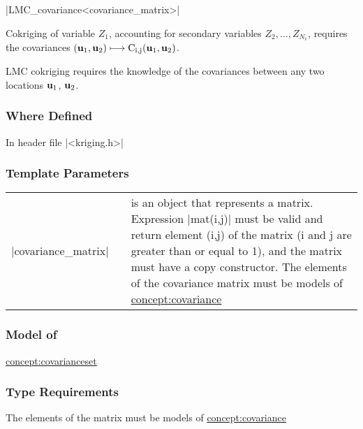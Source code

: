 \documentclass[12pt,twoside]{report}
\newcommand{\mloc}[1]{\rm{\bf #1}}
\begin{document}
|LMC_covariance<covariance_matrix>|
\vspace{0.3cm}

Cokriging of variable $Z_1$, accounting for secondary variables $Z_2,\ldots,Z_{N_v}$, requires the covariances $(\mloc{u}_1,\mloc{u}_2) \longmapsto C_{i,j}(\mloc{u}_1,\mloc{u}_2)$.

LMC cokriging requires the knowledge of the covariances between any two locations $\mloc{u}_1$, $\mloc{u}_2$. 

\htmlrule[CLEAR=all]  \subsubsection*{Where Defined}
In header file |<kriging.h>|

\htmlrule[CLEAR=all]  \subsubsection*{Template Parameters}
\begin{tabular}[!h]{l l p{10cm}}
|covariance_matrix| & & is an object that represents a matrix. Expression |mat(i,j)| must be valid and return element (i,j) of the matrix (i and j are greater than or equal to 1), and the matrix must have a copy constructor. The elements of the covariance matrix must be models of \hyperref{Covariance}{Covariance}{}{concept:covariance}\\
\end{tabular}


\htmlrule[CLEAR=all]  \subsubsection*{Model of}
\hyperref{Covariance Set}{Covariance Set}{}{concept:covarianceset}

\htmlrule[CLEAR=all]  \subsubsection*{Type Requirements}
The elements of the matrix must be models of \hyperref{Covariance}{Covariance}{}{concept:covariance}
\end{document}
